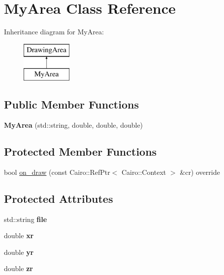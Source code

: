 \hypertarget{class_my_area}{}\section{My\+Area Class Reference}
\label{class_my_area}
Inheritance diagram for My\+Area\+:\begin{figure}[H]
\begin{center}
\leavevmode
\includegraphics[height=2.000000cm]{class_my_area}
\end{center}
\end{figure}
\subsection*{Public Member Functions}
\begin{DoxyCompactItemize}
\item 
\mbox{\label{class_my_area_abfd3125c4ffc88d32742d44e06a13375}} 
{\bfseries My\+Area} (std\+::string, double, double, double)
\end{DoxyCompactItemize}
\subsection*{Protected Member Functions}
\begin{DoxyCompactItemize}
\item 
bool \mbox{\hyperlink{class_my_area_af5d07988d7c9a6a623ba2fdd3332835b}{on\+\_\+draw}} (const Cairo\+::\+Ref\+Ptr$<$ Cairo\+::\+Context $>$ \&cr) override
\end{DoxyCompactItemize}
\subsection*{Protected Attributes}
\begin{DoxyCompactItemize}
\item 
\mbox{\label{class_my_area_a5b95fdb704e973a2e9d4a833d49fe8bd}} 
std\+::string {\bfseries file}
\item 
\mbox{\label{class_my_area_a32b8946639ee818092a5dce039a48a97}} 
double {\bfseries xr}
\item 
\mbox{\label{class_my_area_a91dee2e74d98f46ae1d267f5c69cecb5}} 
double {\bfseries yr}
\item 
\mbox{\label{class_my_area_a10a1f8bf97d246395bfe550c0b24aa01}} 
double {\bfseries zr}
\end{DoxyCompactItemize}


